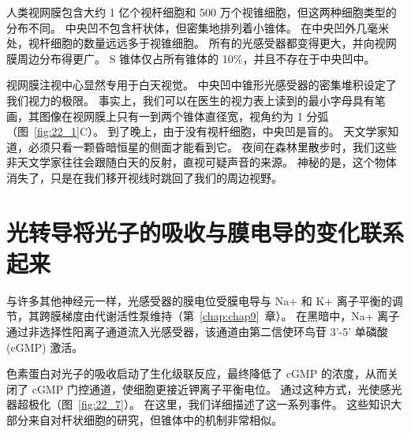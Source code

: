 人类视网膜包含大约 1 亿个视杆细胞和 500 万个视锥细胞，但这两种细胞类型的分布不同。
中央凹不包含杆状体，但密集地排列着小锥体。
在中央凹外几毫米处，视杆细胞的数量远远多于视锥细胞。
所有的光感受器都变得更大，并向视网膜周边分布得更广。
S 锥体仅占所有锥体的 10\%，并且不存在于中央凹中。


视网膜注视中心显然专用于白天视觉。
中央凹中锥形光感受器的密集堆积设定了我们视力的极限。
事实上，我们可以在医生的视力表上读到的最小字母具有笔画，其图像在视网膜上只有一到两个锥体直径宽，视角约为 1 分弧（图~\ref{fig:22_1}C）。
到了晚上，由于没有视杆细胞，中央凹是盲的。
天文学家知道，必须只看一颗昏暗恒星的侧面才能看到它。
夜间在森林里散步时，我们这些非天文学家往往会跟随白天的反射，直视可疑声音的来源。 
神秘的是，这个物体消失了，只是在我们移开视线时跳回了我们的周边视野。



\section{光转导将光子的吸收与膜电导的变化联系起来}

与许多其他神经元一样，光感受器的膜电位受膜电导与 Na+ 和 K+ 离子平衡的调节，其跨膜梯度由代谢活性泵维持（第~\ref{chap:chap9}~章）。
在黑暗中，Na+ 离子通过非选择性阳离子通道流入光感受器，该通道由第二信使环鸟苷 3'-5' 单磷酸 (cGMP) 激活。


色素蛋白对光子的吸收启动了生化级联反应，最终降低了 cGMP 的浓度，从而关闭了 cGMP 门控通道，使细胞更接近钾离子平衡电位。
通过这种方式，光使感光器超极化（图~\ref{fig:22_7}）。
在这里，我们详细描述了这一系列事件。
这些知识大部分来自对杆状细胞的研究，但锥体中的机制非常相似。


